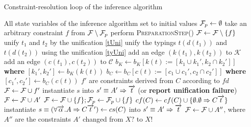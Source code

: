 \begin{algorithm}
    \small
    \caption{Constraint-resolution loop of the inference algorithm}
    \label{main_loop}
    \begin{algorithmic}
        \Require All state variables of the inference algorithm set to initial values
        \State $\mathcal F_p \gets \emptyset$ 
            \State take an arbitrary constraint $f$ from $\mathcal F \setminus \mathcal F_p$
            \State perform \textsc{PreparationStep()}
            \State $\mathcal F \gets \mathcal F \setminus \{f\}$ 
                \State unify $t_1$ and $t_2$ by the unification \ref{tUni}
                \State unify the typings $t (d (t_1))$ and $t (d (t_2))$ using the unification \ref{tyUni}
                \State add an edge $(k(t_1), k(t_2))$ to $\mathcal{K}$
                \State add an edge $(c(t_1), c(t_2))$ to $\mathcal{C}$
                \State $b_K \gets b_K[ k(t) := [k_1 \cup k_1', k_2 \cap k_2'] ]$ \textbf{where} $[k_1', k_2'] \gets b_K(k(t))$
                \State $b_C \gets b_C[ c(t) := [c_1 \cup c_1', c_2 \cap c_2'] ]$ \textbf{where} $[c_1', c_2'] \gets b_C(c(t))$
                    \State $f'$ are constraints derived from $C$ according to $fd$
                    \State $\mathcal F \gets \mathcal F \cup f'$
                    \State instantiate $s$ into $s' \equiv A' \Rightarrow \overrightarrow{t}$ (or \textbf{report unification failure})
                    \State $\mathcal F \gets \mathcal F \cup A'$
                \Else
                    \State $\mathcal F \gets \mathcal F \cup \{f\}; \mathcal F_p \gets \mathcal F_p \cup \{f\}$ 
                \EndIf
                \State $cf(C) \gets cf(C) \cup \{\emptyset . \emptyset \Rightarrow C \overrightarrow{t}\} $
                \State instantiate $s \equiv (\forall \overrightarrow{\alpha} . A \Rightarrow C \overrightarrow{t}') \gets cs(C)$ into $s' \equiv A' \Rightarrow \overrightarrow{t}$
                \State $\mathcal F \gets \mathcal F \cup A''$, where $A''$ are the constraints $A'$ changed from $X?$ to $X!$

\end{algorithmic}
\end{algorithm}
